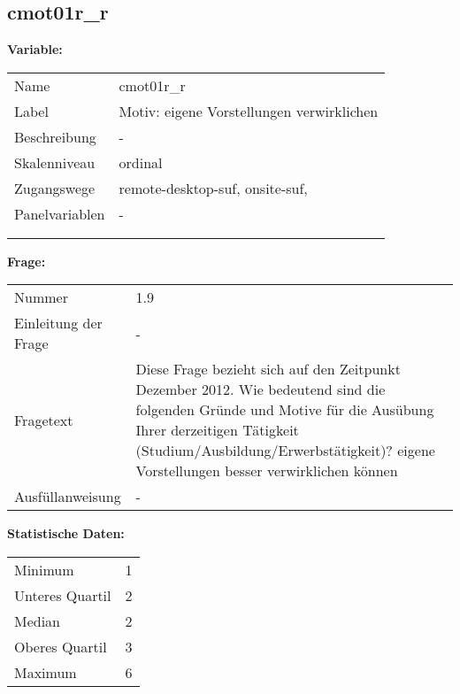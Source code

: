 	
	
	\subsection{cmot01r\_r}
	\label{subSection:cmot01r_r}

	\noindent\textbf{Variable:}\\
		\begin{tabular}{lL{11.3cm}}
			\label{tableVariable:cmot01r_r}
			Name & cmot01r\_r \\
			Label & Motiv: eigene Vorstellungen verwirklichen \\
			Beschreibung & - \\
			Skalenniveau & ordinal \\
			Zugangswege &
				remote-desktop-suf,
				onsite-suf,
 \\
			Panelvariablen & -
			 \\
			 \\
 \\
		\end{tabular}

		\vspace*{1 cm}
		\noindent\textbf{Frage:}\\
		\begin{tabular}{lL{11.3cm}}
			\label{tableQuestion:cmot01r_r}
			Nummer & 1.9 \\
			Einleitung der Frage & - \\
			Fragetext & Diese Frage bezieht sich auf den Zeitpunkt Dezember 2012. Wie bedeutend sind die folgenden Gründe und Motive für die Ausübung Ihrer derzeitigen Tätigkeit (Studium/Ausbildung/Erwerbstätigkeit)?
eigene Vorstellungen besser verwirklichen können \\
			Ausfüllanweisung & - \\
		\end{tabular}


		\vspace*{1 cm}
		\noindent\textbf{Statistische Daten:}\\
			\begin{tabular}{ll}
				\label{tableStatistics:cmot01r_r}
					Minimum & 1 \\
					Unteres Quartil & 2 \\
					Median & 2 \\
					Oberes Quartil & 3 \\
					Maximum & 6 \\
			\end{tabular}




